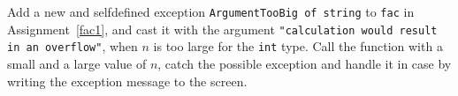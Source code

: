 \label{fac} Add a new and selfdefined exception \lstinline{ArgumentTooBig of string} to \lstinline{fac} in Assignment~\ref{fac1}, and cast it with the argument \lstinline{"calculation would result in an overflow"}, when $n$ is too large for the \lstinline{int} type. Call the function with a small and a large value of $n$, catch the possible exception and handle it in case by writing the exception message to the screen.